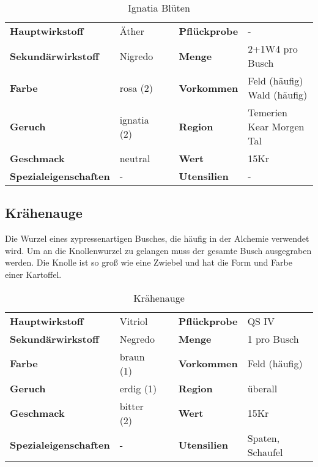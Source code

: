 \begin{table}[h] 
\begin{center} 
\begin{tabular}{|l|l|p{1cm}|l|l|} 
  	\cline{1-2} \cline{4-5} 
  	\textbf{Hauptwirkstoff} & Äther && \textbf{Pflückprobe} & - \\ \cline{1-2} \cline{4-5} 
  	\textbf{Sekundärwirkstoff} & Nigredo && \textbf{Menge} & 2+1W4 pro Busch \\ \cline{1-2} \cline{4-5} 
  	\textbf{Farbe} & rosa (2) && \textbf{Vorkommen} & \brcell{Feld (häufig) \\ Wald (häufig)} \\ \cline{1-2} \cline{4-5} 
  	\textbf{Geruch} & ignatia (2) && \textbf{Region} & \brcell{Temerien \\ Kear Morgen Tal} \\ \cline{1-2} \cline{4-5} 
  	\textbf{Geschmack} & neutral && \textbf{Wert} & 15Kr \\ \cline{1-2} \cline{4-5} 
  	\textbf{Spezialeigenschaften} & - && \textbf{Utensilien} & - \\ \cline{1-2} \cline{4-5} 
\end{tabular} 
\end{center} 
\caption{Ignatia Blüten} 
\label{tab:ignatia_blueten} 
\end{table}

\subsection{Krähenauge}
Die Wurzel eines zypressenartigen Busches, die häufig in der Alchemie verwendet wird. Um an die Knollenwurzel zu gelangen muss der gesamte Busch ausgegraben werden. Die Knolle ist so groß wie eine Zwiebel und hat die Form und Farbe einer Kartoffel.
\newpage
\begin{table}[h] 
\begin{center} 
\begin{tabular}{|l|l|p{1cm}|l|l|} 
  	\cline{1-2} \cline{4-5} 
  	\textbf{Hauptwirkstoff} & Vitriol && \textbf{Pflückprobe} & QS IV \\ \cline{1-2} \cline{4-5} 
  	\textbf{Sekundärwirkstoff} & Negredo && \textbf{Menge} & 1 pro Busch \\ \cline{1-2} \cline{4-5} 
  	\textbf{Farbe} & braun (1) && \textbf{Vorkommen} & Feld (häufig) \\ \cline{1-2} \cline{4-5} 
  	\textbf{Geruch} & erdig (1) && \textbf{Region} & überall \\ \cline{1-2} \cline{4-5} 
  	\textbf{Geschmack} & bitter (2) && \textbf{Wert} & 15Kr \\ \cline{1-2} \cline{4-5} 
  	\textbf{Spezialeigenschaften} & - && \textbf{Utensilien} & Spaten, Schaufel \\ \cline{1-2} \cline{4-5} 
\end{tabular} 
\end{center} 
\caption{Krähenauge} 
\label{tab:kraehenauge} 
\end{table}

